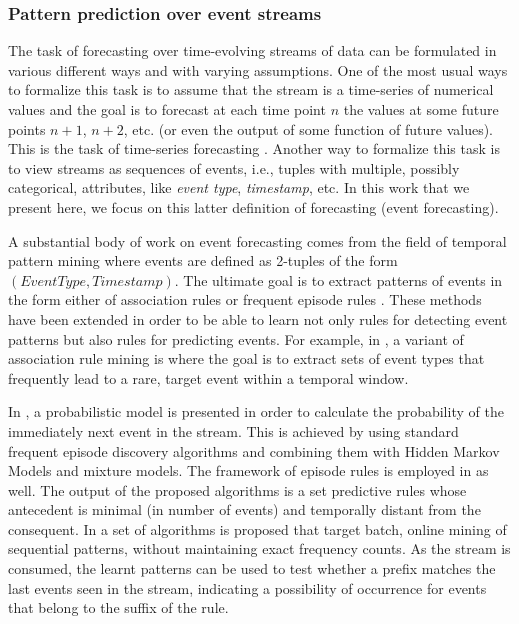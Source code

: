 

\subsubsection*{Pattern prediction over event streams}

\par The task of forecasting over time-evolving streams of data can be formulated in various different ways and with varying assumptions.
One of the most usual ways to formalize this task is to assume that the stream is a time-series of numerical values and the goal is to forecast at each time point $n$ the values at some future points $n+1$, $n+2$, etc. (or even the output of some function of future values). 
This is the task of time-series forecasting \cite{montgomery_introduction_2015}.
Another way to formalize this task is to view streams as sequences of events,
i.e., tuples with multiple, possibly categorical, attributes, like \textit{event type}, \textit{timestamp}, etc. 
In this work that we present here, 
we focus on this latter definition of forecasting (event forecasting).  

\par A substantial body of work on event forecasting comes from the field of temporal pattern mining where events are defined as 2-tuples of the form $(\mathit{EventType},\mathit{Timestamp})$.
The ultimate goal is to extract patterns of events in the form either of association rules \cite{agrawal_mining_1993} or frequent episode rules \cite{mannila_discovery_1997}. 
These methods have been extended in order to be able to learn not only rules for detecting event patterns but also rules for predicting events.
For example, in \cite{vilalta_predicting_2002}, a variant of association rule mining is where the goal is to extract sets of event types that frequently lead to a rare, target event within a temporal window. 
\par In \cite{laxman_stream_2008}, a probabilistic model is presented
in order to calculate the probability of the immediately next event in the stream. 
This is achieved by using standard frequent episode discovery algorithms and combining them with Hidden Markov Models and mixture models.
The framework of episode rules is employed in \cite{fahed_efficient_2014} as well.
The output of the proposed algorithms is a set predictive rules whose antecedent is minimal (in number of events) and temporally distant from the consequent.
In \cite{zhou_pattern_2015} a set of algorithms is proposed that target batch, online mining of sequential patterns, without maintaining exact frequency counts.
As the stream is consumed, the learnt patterns can be used to test whether a prefix matches the last events seen in the stream, 
indicating a possibility of occurrence for events that belong to the suffix of the rule.

